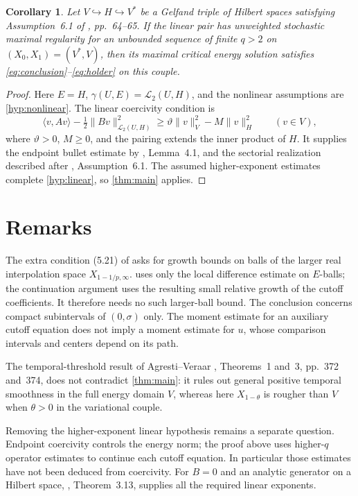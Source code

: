\documentclass[11pt]{amsart}
\newtheorem{corollary}[theorem]{Corollary}
\theoremstyle{definition}
\theoremstyle{remark}
\newcommand{\norm}[2][]{\lVert #2\rVert_{#1}}
\numberwithin{equation}{section}
\begin{document}
\begin{corollary}\label{cor:variational}
Let $V\hookrightarrow H\hookrightarrow V^*$ be a Gelfand triple of
Hilbert spaces satisfying Assumption~6.1 of \cite{Survey}, pp.~64--65.
If the linear pair has unweighted stochastic maximal regularity for
an unbounded sequence of finite $q>2$ on $(X_0,X_1)=(V^*,V)$, then
its maximal critical energy solution satisfies
\eqref{eq:conclusion}--\eqref{eq:holder} on this couple.
\end{corollary}

\begin{proof}
Here $E=H$, $\gamma(U,E)=\mathcal L_2(U,H)$, and the nonlinear
assumptions are \cref{hyp:nonlinear}. The linear coercivity condition is
\[
 \langle v,Av\rangle-\tfrac12\norm[\mathcal L_2(U,H)]{Bv}^2
 \ge\vartheta\norm[V]{v}^2-M\norm[H]{v}^2\qquad(v\in V),
\]
where $\vartheta>0$, $M\ge0$, and the pairing extends the inner
product of $H$. It supplies the endpoint bullet estimate by
\cite{CV}, Lemma~4.1, and the sectorial realization described after
\cite{Survey}, Assumption~6.1. The assumed higher-exponent estimates
complete \cref{hyp:linear}, so \cref{thm:main} applies.
\end{proof}

\section{Remarks}

The extra condition (5.21) of \cite{Survey} asks for growth bounds on
balls of the larger real interpolation space $X_{1-1/p,\infty}$.
 uses only the local difference estimate on $E$-balls;
the continuation argument uses the resulting small relative growth of
the cutoff coefficients. It therefore needs no such larger-ball bound.
The conclusion concerns compact subintervals of $(0,\sigma)$ only.
The moment estimate for an auxiliary cutoff equation does not imply
a moment estimate for $u$, whose comparison intervals and centers
depend on its path.

The temporal-threshold result of Agresti--Veraar \cite{Threshold},
Theorems~1 and~3, pp.~372 and~374, does not contradict
\cref{thm:main}: it rules out general positive temporal smoothness
in the full energy domain $V$, whereas here $X_{1-\theta}$ is
rougher than $V$ when $\theta>0$ in the variational couple.

Removing the higher-exponent linear hypothesis remains a separate
question. Endpoint coercivity controls the energy norm; the proof
above uses higher-$q$ operator estimates to continue each cutoff
equation. In particular those estimates have not been deduced from
coercivity. For $B=0$ and an analytic generator on a Hilbert space,
\cite{Survey}, Theorem~3.13, supplies all the required linear exponents.
\end{document}
